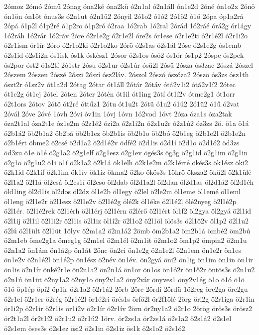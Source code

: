{2ómoz
2ómó
2ómű
2ónag
óna2ké
óna2kü
ó2n1al
ó2n1áll
ón1e2d
2óné
ón1o2x
2ónö
ón1ön
ón1öt
ónus3s
ó2n1ut
ó2n1ü2
2ónyil
2ó1o2
ó1ó2
2ó1ö2
ó1ő
2ópa
óp1a2rá
2ópá
ó1p2l
ó1p2ré
ó1p2ro
ó1p2ró
ó2raa
1ó2rab
1ó2ral
2órád
1ó2ráé
órá2g
ór1ágy
1ó2ráh
1ó2rár
1ó2ráv
2óre
ó2r1e2g
ó2r1e2l
óre2s
ór1ese
ó2r1e2ti
ó2r1é2l
ó2r1i2o
ó2r1ism
ór1ír
2óro
ó2r1o2ki
ó2r1o2ko
2órö
ó2s1as
ó2s1ál
2óse
ó2s1e2g
ós1emb
ó2s1id
ó2s1i2n
ós1isk
ós1k
óskész1
2ósor
ó2s1os
ósó2
ós1ór
ós1p2
2óspe
ós2pek
ós2por
óst2
ó1s2tí
2ó1str
2ósu
ó2s1ur
ó2s1úr
ósü2l
2ósű
2ósza
ós3zac
2ószá
2ószel
2ószem
2ószen
2ószé
2ószi
2ószí
ósz2láv.
2ószol
2ószó
ószóza2
2ószö
ós3zs
ósz1th
ószt2r
ó1sz2v
ót1a2d
2ótag
2ótar
ót1áll
2ótár
2ótáv
ótá2v1i2
ótá2v1í2
2ótec
ót1e2g
ót1ej
2ótel
2óten
2óter
2ótén
ót1il
ót1ing
2ótí
ót1í2v
ótme2g1
ót1orr
ó2t1ors
2ótov
2ótö
ót2ré
óttűz1
2ótu
ót1u2t
2ótü
ó1u2
ó1ú2
2ó1ü2
ó1ű
ó2vat
2óvál
2óve
2óvé
1óvh
2óvi
óv1in
1óvj
1óvn
1ó2vod
1óvt
2óza
óza1s
óza2tak
óza2t1al
óza2t1e
óz1e2m
ó2z1é2
ózi2a
ó2z1i2n
ó2z1u2r
ó2z1ú2
óz3zs
2ö.
ö1a
ö1á
ö2b1á2
öb2b1a2
öb2bá
öb2b1ez
öb2b1is
öb2b1o
öb2bó
ö2b1eg
ö2b1e2l
ö2b1e2n
ö2b1ért
öbme2
ö2csé
ö2d1a2
ö2d1é2v
ödfé2
ö2d1is
ö2d1í
ö2d1o
ö2d1ó2
öd3zs
öd3zu
ö1e
ö1é
ö2g1a2
ö2g1elf
ö2g1esz
ö2g1ev
ögés3s
ög3g
ö2g1id
ö2g1im
ö2g1in
ö2g1o
ö2g1u2
ö1i
ö1í
ö2k1a2
ö2k1á
ök1elh
ö2k1e2m
ö2k1érté
ökés3s
ök1ész
öki2
ö2k1id
ö2k1if
ö2k1im
ök1ív
ök1íz
ökma2
ö2ko
ökös3s
1ökrö
öksza2
ökü2l
ö2k1ülé
ö2l1a2
ö2l1á
öl2csá
öl2cs1í
öl2cso
öl2dab
öl2d1a2l
öl2dan
öl2d1as
öl2d1á2
öl2d1éh
öld1ing
öl2d1is
öl2dos
öl2dz
öl1e2b
öl1egy
ö2lel
ö2le2m
öl1eme
öl1emé
öl1eml
öl1eng
ö2l1e2r
ö2l1esz
ö2l1e2v
ö2l1é2g
ölé2k
öl1éke
ö2l1é2l
ölé2nyeg
ö2l1é2p
ö2l1ér.
ö2l1é2rek
ö2l1érh
ö2l1érj
ö2l1érn
ö2lérő
ö2l1ért
öl1f2
öl2gya
öl2gyá
ö2l1id
ö2l1ij
ö2l1il
ö2l1i2r
ö2l1is
ö2l1iz
öl1í2r
ö2l1o2
ö2l1öl
ölös3s
ö2l1ö2v
öl1p2
ö2l1u2
ö2lú
ö2l1ült
ö2l1üt
1ölyv
ö2m1a2
ö2m1á2
2ömb
öm2b1a2
öm2b1á
ömbé2
öm2bú
ö2m1eb
öme2g1a
ömeg1g
ö2m1el
ö2m1él
ö2m1it
ö2m1o2
öm1p2
ömpin2
ö2m1u
ö2n1a2
ön1ám
ön1á2p
ön1át
2önc
ön2ci
ön1e2g
ö2n1e2l
ö2n1em
ön1e2r
ön1es
ön1e2v
ö2n1é2l
ön1é2p
ön1ész
ö2név
ön1év.
ön2gyá
öni2
ön1ig
ön1im
ön1in
ön1ir
ön1is
ö2n1ír
önké2r1e
ön2n1a2
ön2n1á
ön1or
ön1os
ön1ó2r
ön1ő2r
öntös3s
ö2n1u2
ö2n1ú
ön1üt
ö2ny1a2
ö2ny1o
öny2v1a2
öny2vár
önyves1
öny2v1ég
ö1o
ö1ó
ö1ö
ö1ő
öp1ép
öpi2
öp1ir
ö2r1a2
ö2r1á2
2örb
2örc
2ördí
2ördü
1ö2reg
öre2ga
öre2gu
ö2r1el
ö2r1er
ö2rég
ö2r1é2l
ör1é2ri
örés1s
örfö2l
ör2f1ölé
2örg
öri2g
ö2r1iga
ö2r1in
ör1i2p
ö2r1ir
ö2r1is
ör1i2v
ö2r1ír
ö2r1ív
2örn
ör2ny1a2
ö2r1o
2örög
örös3s
örösz2
ör2t1a2l
ör2t1í2
ö2r1u2
ö2r1ú2
1örv.
ör2zs1a
ör2zs1á
ö2s1a2
ö2s1á2
ö2s1el
ö2s1em
öses3s
ö2s1ez
ösi2
ö2s1in
ö2s1iz
ös1k
ö2s1o2
ö2s1ó2
}
